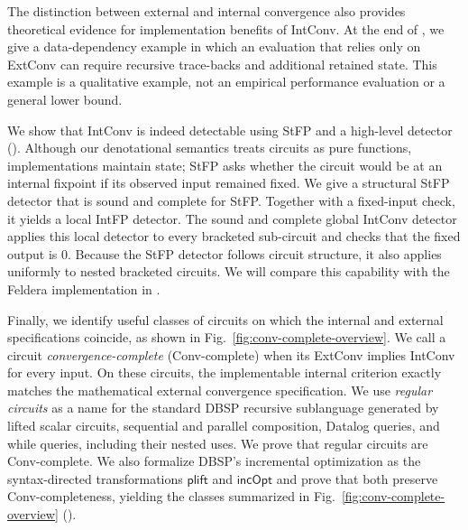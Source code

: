 The distinction between external and internal convergence also provides theoretical evidence for implementation benefits of IntConv. At the end of , we give a data-dependency example in which an evaluation that relies only on ExtConv can require recursive trace-backs and additional retained state. This example is a qualitative example, not an empirical performance evaluation or a general lower bound.

We show that IntConv is indeed detectable using StFP and a high-level detector (). Although our denotational semantics treats circuits as pure functions, implementations maintain state; StFP asks whether the circuit would be at an internal fixpoint if its observed input remained fixed. We give a structural StFP detector that is sound and complete for StFP. Together with a fixed-input check, it yields a local IntFP detector. The sound and complete global IntConv detector applies this local detector to every bracketed sub-circuit and checks that the fixed output is $0$. Because the StFP detector follows circuit structure, it also applies uniformly to nested bracketed circuits. We will compare this capability with the Feldera implementation in .

Finally, we identify useful classes of circuits on which the internal and external specifications coincide, as shown in Fig.~\ref{fig:conv-complete-overview}. We call a circuit \emph{convergence-complete} (Conv-complete) when its ExtConv implies IntConv for every input. On these circuits, the implementable internal criterion exactly matches the mathematical external convergence specification. We use \emph{regular circuits} as a name for the standard DBSP recursive sublanguage generated by lifted scalar circuits, sequential and parallel composition, Datalog queries, and while queries, including their nested uses. We prove that regular circuits are Conv-complete. We also formalize DBSP's incremental optimization as the syntax-directed transformations $\mathsf{plift}$ and $\mathsf{incOpt}$ and prove that both preserve Conv-completeness, yielding the classes summarized in Fig.~\ref{fig:conv-complete-overview} ().

